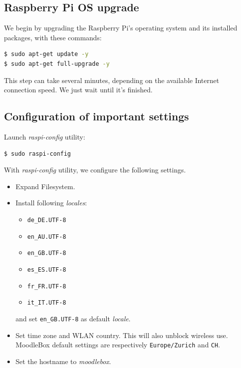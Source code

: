\documentclass[12pt]{article}
\begin{document}

\subsection{Raspberry Pi OS upgrade}

We begin by upgrading the Raspberry Pi's operating system and its installed packages, with these commands:
\begin{lstlisting}[language=bash]
$ sudo apt-get update -y
$ sudo apt-get full-upgrade -y
\end{lstlisting}

This step can take several minutes, depending on the available Internet connection speed.
We just wait until it's finished.

\subsection{Configuration of important settings}

Launch \emph{raspi-config} utility:
\begin{lstlisting}[language=bash]
$ sudo raspi-config
\end{lstlisting}

With \emph{raspi-config} utility, we configure the following settings.
\begin{itemize}
\item Expand Filesystem.
\item Install following \emph{locales}:
\begin{itemize}
\item \lstinline{de_DE.UTF-8}
\item \lstinline{en_AU.UTF-8}
\item \lstinline{en_GB.UTF-8}
\item \lstinline{es_ES.UTF-8}
\item \lstinline{fr_FR.UTF-8}
\item \lstinline{it_IT.UTF-8}
\end{itemize}
and set \lstinline{en_GB.UTF-8} as default \emph{locale}.
\item Set time zone and WLAN country.
This will also unblock wireless use.
MoodleBox default settings are respectively \lstinline{Europe/Zurich} and \lstinline{CH}.
\item Set the hostname to \emph{moodlebox}.
\end{itemize}
\end{document}
